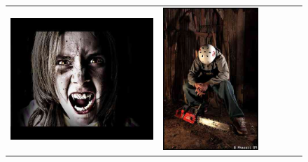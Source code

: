 \begin{figure}
\begin{tabular}{m{.01\linewidth} m{.16\linewidth} m{.16\linewidth} m{.16\linewidth} m{.16\linewidth} m{.16\linewidth}}
    \includegraphics[width=\linewidth]{../style/figures/flickr_on_flickr/pred_style_Horror/3.jpg} &
    \includegraphics[width=\linewidth]{../style/figures/flickr_on_flickr/pred_style_Horror/4.jpg} \\

\end{tabular}
\end{figure}
